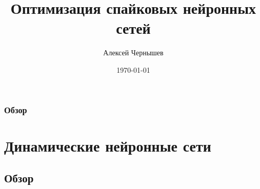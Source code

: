 \documentclass{beamer}
\title[Оптимизация спайковых нейронных сетей]{Оптимизация спайковых нейронных сетей} %
\author{Алексей Чернышев} %
\institute[BMSTU] %
{
Аспирант РК 6\\
Научный руководитель:\\ д.ф.-м.н Анатолий Павлович Карпенко\\
\medskip
МГТУ им. Н.Э. Баумана \\ %
\medskip
\textit{alexey.chernushev@gmail.com} %
}
\date{\today} %
\begin{document}
\begin{frame}
\titlepage %
\end{frame}

\begin{frame}
\frametitle{Обзор} %
\tableofcontents %
\end{frame}


\section{Динамические нейронные сети} %

\subsection{Обзор} %
\end{document}
